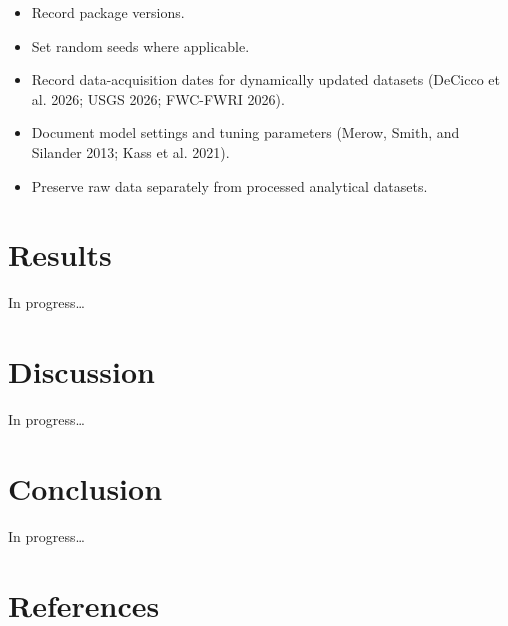 \documentclass[
  letterpaper,
  DIV=11,
  numbers=noendperiod]{scrartcl}
\providecommand{\tightlist}{%
  \setlength{\itemsep}{0pt}\setlength{\parskip}{0pt}}
\begin{document}
\begin{enumerate}
\begin{enumerate}
    \begin{itemize}
    \tightlist
    \item
      Record package versions.
    \item
      Set random seeds where applicable.
    \item
      Record data-acquisition dates for dynamically updated datasets
      (DeCicco et al. 2026; USGS 2026; FWC-FWRI 2026).
    \item
      Document model settings and tuning parameters (Merow, Smith, and
      Silander 2013; Kass et al. 2021).
    \item
      Preserve raw data separately from processed analytical datasets.
    \end{itemize}
  \end{enumerate}
\end{enumerate}

\section{Results}\label{results}

In progress\ldots{}

\section{Discussion}\label{discussion}

In progress\ldots{}

\section{Conclusion}\label{conclusion}

In progress\ldots{}

\section{References}\label{references}
\end{document}
